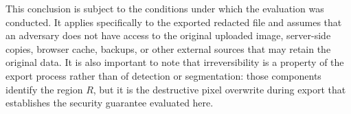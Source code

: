 This conclusion is subject to the conditions under which the evaluation was conducted. It applies specifically to the exported redacted file and assumes that an adversary does not have access to the original uploaded image, server-side copies, browser cache, backups, or other external sources that may retain the original data. It is also important to note that irreversibility is a
property of the export process rather than of detection or \gls{segmentation}: those components identify the region $R$, but it is the destructive pixel overwrite during export that establishes the security guarantee evaluated here.






\afterpage{\blankpage}

